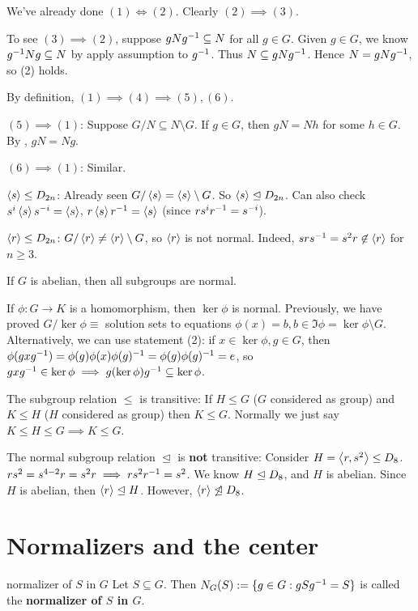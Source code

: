 \begin{pf}
We've already done $(1)\iff (2)$. Clearly $(2)\implies (3)$. 

To see $(3)\implies (2)$, suppose $gNg^{-1} \subseteq N$ for all $g\in G$. Given $g\in G$, we know $g^{-1} N g\subseteq N$ by apply assumption to $g^{-1}$. Thus $N\subseteq gNg^{-1}$. Hence $N=g N g^{-1}$, so (2) holds.

By definition, $(1)\implies (4)\implies (5),(6)$.

$(5)\implies (1)$: Suppose $G/N\subseteq N\setminus G$. If $g\in G$, then $gN=Nh$ for some $h\in G$. By , $gN=Ng$.

$(6)\implies (1)$: Similar.
\end{pf}

\begin{ex}
$\left\langle s \right\rangle\le D_{2n}$: Already seen $G/\left\langle s \right\rangle= \left\langle s \right\rangle\setminus G$. So $\left\langle s \right\rangle\trianglelefteq D_{2n}$. Can also check $s^i \left\langle s \right\rangle s^{-i} = \left\langle s \right\rangle$, $r\left\langle s \right\rangle r^{-1}= \left\langle s \right\rangle$ (since $rs^i r^{-1} = s^{-i}$).

$\left\langle r \right\rangle\le D_{2n}$: $G/\left\langle r \right\rangle \ne \left\langle r \right\rangle\setminus G$, so $\left\langle r \right\rangle$ is not normal. Indeed, $srs^{-1} = s^2r\not\in \left\langle r \right\rangle$ for $n\ge 3$. 

If $G$ is abelian, then all subgroups are normal.

If $\phi:G\to K$ is a homomorphism, then $\ker \phi$ is normal. Previously, we have proved $G/\ker\phi \equiv$ solution sets to equations $\phi(x)=b, b\in \Im\phi = \ker \phi\setminus G$. Alternatively, we can use statement (2): if $x\in \ker\phi, g\in G$, then $\phi(gxg^{-1})=\phi(g)\phi(x)\phi(g)^{-1} = \phi(g)\phi(g)^{-1} = e$, so $gxg^{-1}\in \ker\phi\implies g(\ker \phi) g^{-1} \subseteq \ker\phi$.
\end{ex}

The subgroup relation $\le$ is transitive: If $H\le G$ ($G$ considered as group) and $K\le H$ ($H$ considered as group) then $K\le G$. Normally we just say $K\le H\le G\implies K\le G$.

The normal subgroup relation $\trianglelefteq$ is \textbf{not} transitive: Consider $H=\left\langle r,s^2 \right\rangle\le D_8$. $rs^2 = s^{4-2}r=s^2r \implies rs^2r^{-1} = s^2$. We know $H\trianglelefteq D_8$, and $H$ is abelian. Since $H$ is abelian, then $\left\langle r \right\rangle\trianglelefteq H$. However, $\left\langle r \right\rangle\not\trianglelefteq D_8$. 

\section{Normalizers and the center}
\begin{defn}{normalizer of $S$ in $G$}
Let $S\subseteq G$. Then $N_G(S):=\{g\in G:gSg^{-1}=S\}$ is called the \textbf{normalizer of $S$ in $G$}.\end{defn}

